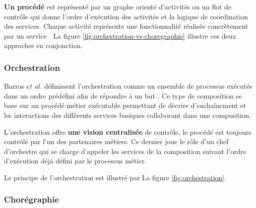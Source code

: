       

      \textbf{Un procédé} est représenté par un graphe orienté
      d'activités ou un flot de contrôle qui donne l'ordre d'exécution
      des activités et la logique de coordination des services. Chaque
      activité représente une fonctionnalité réalisée concrètement par
      un service \cite{chollet2009orchestration}. La figure
      \ref{fig:orchestration-vs-choregraphie} illustre ces deux
      approches en conjonction.


        \subsubsection{Orchestration}
        \label{sec:orchestration}
        Barros \emph{et al.} \cite{barros2006standards} définissent
        l'orchestration comme un ensemble de processus exécutés dans
        un ordre prédéfini afin de répondre à un but
        \cite{lopez2008selection}. Ce type de composition se base sur
        un procédé métier exécutable permettant de décrire
        d'enchaînement et les interactions des différents services
        basiques collaborant dans une composition.

        L'orchestration offre \textbf{une vision centralisée} de
        contrôle, le procédé est toujours contrôlé par l'un des
        partenaires métiers. Ce dernier joue le rôle d'un chef
        d'orchestre qui se charge d'appeler les services de la
        composition suivant l'ordre d'exécution déjà défini par le
        processus métier.

        Le principe de l'orchestration est illustré
        par La figure \ref{fig:orchestration}.

        

        \subsubsection{Chorégraphie}
        \label{sec:choregraphie}

